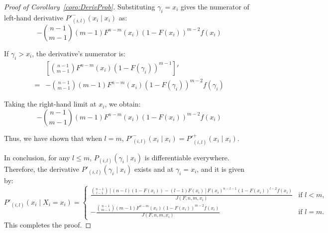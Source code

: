 \begin{proof}[Proof of Corollary~\ref{coro:DerivProb}]
Substituting \(\gamma_i = x_i\) gives the numerator of left-hand derivative \( P'^{-}_{(i,l)}(x_i \mid x_i) \) as:
\[
-\binom{n-1}{m-1}(m-1) F^{n-m}(x_i)(1-F(x_i))^{m-2} f(x_i)
\]

If \( \gamma_i > x_i \), the derivative's numerator is:
\[
\begin{aligned}
    & \left[ \binom{n-1}{m-1} F^{n-m}(x_i)(1-F(\gamma_i))^{m-1} \right]' \\
    = & -\binom{n-1}{m-1}(m-1) F^{n-m}(x_i)(1-F(\gamma_i))^{m-2} f(\gamma_i)
\end{aligned}
\]

Taking the right-hand limit at $x_i$, we obtain:
\[
-\binom{n-1}{m-1}(m-1) F^{n-m}(x_i)(1-F(x_i))^{m-2} f(x_i)
\]

Thus, we have shown that when \( l = m \), \( P'^{-}_{(i,l)}(x_i \mid x_i) = P'^{+}_{(i,l)}(x_i \mid x_i) \).

In conclusion, for any \( l \leq m \), \( P_{(i,l)}(\gamma_i \mid x_i) \) is differentiable everywhere. Therefore, the derivative \( P'_{(i,l)}(\gamma_i \mid x_i) \) exists and at \( \gamma_i = x_i \), and it is given by:
\[
P'_{(i,l)}(x_i \mid X_i = x_i) =   
\begin{cases} 
\frac{\binom{n-1}{l-1} \left[ (n-l)(1-F(x_i))-(l-1)F(x_i) \right] F(x_i)^{n-l-1}(1-F(x_i))^{l-2} f(x_i)}{J(F,n,m,x_i)} & \text{if } l < m, \\
- \frac{\binom{n-1}{m-1}(m-1) F^{n-m}(x_i)(1-F(x_i))^{m-2} f(x_i)}{J(F,n,m,x_i)} & \text{if } l = m.
\end{cases}
\]
This completes the proof.
\end{proof}


